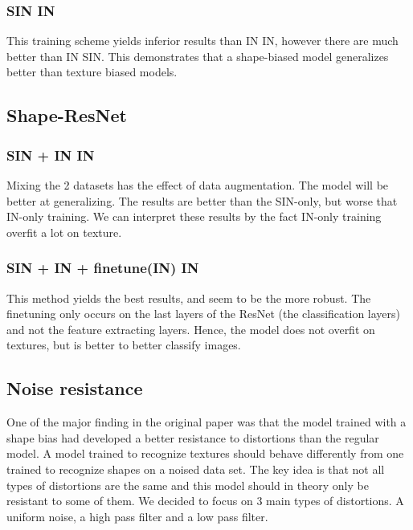 \documentclass{article}
\begin{document}
\subsubsection{SIN \texorpdfstring{\textrightarrow} .IN}

This training scheme yields inferior results than IN \texorpdfstring{\textrightarrow} IIN, however
there are much better than IN \texorpdfstring{\textrightarrow} .SIN.
This demonstrates that a shape-biased model generalizes better than texture biased models.

\subsection{Shape-ResNet}

\subsubsection{SIN + IN \texorpdfstring{\textrightarrow} .IN}

Mixing the 2 datasets has the effect of data augmentation. The model will be better
at generalizing. The results are better than the SIN-only, but worse that IN-only training.
We can interpret these results by the fact IN-only training overfit a lot on texture.

\subsubsection{SIN + IN + finetune(IN) \texorpdfstring{\textrightarrow} .IN}

This method yields the best results, and seem to be the more robust. The finetuning only occurs
on the last layers of the ResNet (the classification layers) and not the feature extracting layers.
Hence, the model does not overfit on textures, but is better to better classify images.

\subsection{Noise resistance}


One of the major finding in the original paper was that the model trained with a shape bias had developed a better resistance to distortions than the regular model.
A model trained to recognize textures should behave differently from one trained to recognize shapes on a noised data set.  The key idea is that not all types of distortions are the same and this model should in theory only be resistant to some of them.  We decided to focus on 3 main types of distortions.  A uniform noise, a high pass filter and a low pass filter.
\end{document}
